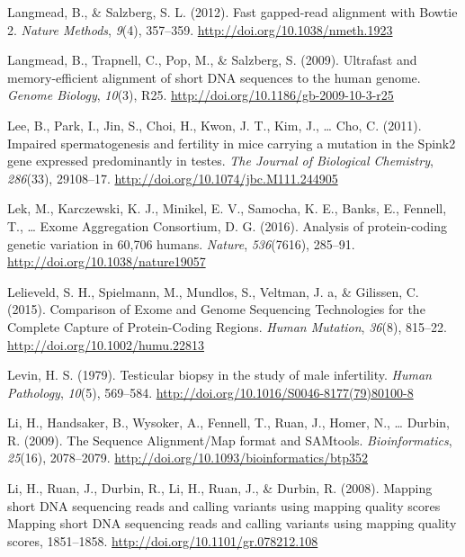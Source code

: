 \documentclass[12pt,twoside]{reedthesis}
\theoremstyle{definition}
\theoremstyle{definition}
\theoremstyle{remark}
\begin{document}
  \hypertarget{ref-Langmead2012}{}
  Langmead, B., \& Salzberg, S. L. (2012). Fast gapped-read alignment with
  Bowtie 2. \emph{Nature Methods}, \emph{9}(4), 357--359.
  \url{http://doi.org/10.1038/nmeth.1923}
  
  \hypertarget{ref-Langmead2009}{}
  Langmead, B., Trapnell, C., Pop, M., \& Salzberg, S. (2009). Ultrafast
  and memory-efficient alignment of short DNA sequences to the human
  genome. \emph{Genome Biology}, \emph{10}(3), R25.
  \url{http://doi.org/10.1186/gb-2009-10-3-r25}
  
  \hypertarget{ref-Lee2011}{}
  Lee, B., Park, I., Jin, S., Choi, H., Kwon, J. T., Kim, J., \ldots{}
  Cho, C. (2011). Impaired spermatogenesis and fertility in mice carrying
  a mutation in the Spink2 gene expressed predominantly in testes.
  \emph{The Journal of Biological Chemistry}, \emph{286}(33), 29108--17.
  \url{http://doi.org/10.1074/jbc.M111.244905}
  
  \hypertarget{ref-Lek2016}{}
  Lek, M., Karczewski, K. J., Minikel, E. V., Samocha, K. E., Banks, E.,
  Fennell, T., \ldots{} Exome Aggregation Consortium, D. G. (2016).
  Analysis of protein-coding genetic variation in 60,706 humans.
  \emph{Nature}, \emph{536}(7616), 285--91.
  \url{http://doi.org/10.1038/nature19057}
  
  \hypertarget{ref-Lelieveld2015}{}
  Lelieveld, S. H., Spielmann, M., Mundlos, S., Veltman, J. a, \&
  Gilissen, C. (2015). Comparison of Exome and Genome Sequencing
  Technologies for the Complete Capture of Protein-Coding Regions.
  \emph{Human Mutation}, \emph{36}(8), 815--22.
  \url{http://doi.org/10.1002/humu.22813}
  
  \hypertarget{ref-Levin1979}{}
  Levin, H. S. (1979). Testicular biopsy in the study of male infertility.
  \emph{Human Pathology}, \emph{10}(5), 569--584.
  \url{http://doi.org/10.1016/S0046-8177(79)80100-8}
  
  \hypertarget{ref-Li2009}{}
  Li, H., Handsaker, B., Wysoker, A., Fennell, T., Ruan, J., Homer, N.,
  \ldots{} Durbin, R. (2009). The Sequence Alignment/Map format and
  SAMtools. \emph{Bioinformatics}, \emph{25}(16), 2078--2079.
  \url{http://doi.org/10.1093/bioinformatics/btp352}
  
  \hypertarget{ref-Li2008}{}
  Li, H., Ruan, J., Durbin, R., Li, H., Ruan, J., \& Durbin, R. (2008).
  Mapping short DNA sequencing reads and calling variants using mapping
  quality scores Mapping short DNA sequencing reads and calling variants
  using mapping quality scores, 1851--1858.
  \url{http://doi.org/10.1101/gr.078212.108}
  
\end{document}
